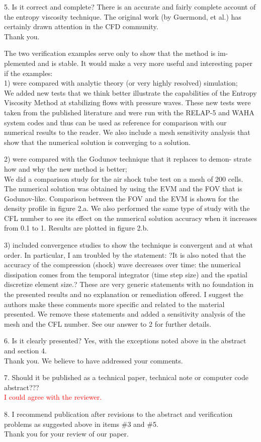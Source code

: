 \documentclass{article}
\newcommand{\tcr}[1]{\textcolor{red}{#1}}
\begin{document}
{\color{blue}
5. Is it correct and complete?
There is an accurate and fairly complete account of the entropy viscosity technique. The original work (by Guermond, et al.) has certainly drawn attention in the CFD community.\\
}
Thank you.

\bigskip

{\color{blue}
The two verification examples serve only to show that the method is im- plemented and is stable. It would make a very more useful and interesting paper if the examples: \\
1) were compared with analytic theory (or very highly resolved) simulation; \\
}
We added new tests that we think better illustrate the capabilities of the Entropy Viscosity Method at stabilizing flows with pressure waves. These new tests were taken from the published literature and were run with the RELAP-5 and WAHA system codes and thus can be used as reference for comparison with our numerical results to the reader. We also include a mesh sensitivity analysis that show that the numerical solution is converging to a solution.
\bigskip

{\color{blue}
2) were compared with the Godunov technique that it replaces to demon- strate how and why the new method is better; \\
}
We did a comparison study for the air shock tube test on a mesh of 200 cells. The numerical solution was obtained by using the EVM and the FOV that is Godunov-like. Comparison between the FOV and the EVM is shown for the density profile in figure 2.a. We also performed the same type of study with the CFL number to see its effect on the numerical solution accuracy when it increases from 0.1 to 1. Results are plotted in figure 2.b.
\bigskip

{\color{blue}
3) included convergence studies to show the technique is convergent and at what order.
In particular, I am troubled by the statement: ?It is also noted that the accuracy of the compression (shock) wave decreases over time: the numerical dissipation comes from the temporal integrator (time step size) and the spatial discretize element size.? These are very generic statements with no foundation in the presented results and no explanation or remediation offered. I suggest the authors make these comments more specific and related to the material presented.
}
We remove these statements and added a sensitivity analysis of the mesh and the CFL number. See our answer to 2 for further details.
\bigskip

{\color{blue}
6. Is it clearly presented?
Yes, with the exceptions noted above in the abstract and section 4. \\
}
Thank you. We believe to have addressed your comments.
\bigskip

{\color{blue}
7. Should it be published as a technical paper, technical note or computer code abstract??? \\}
\tcr{I could agree with the reviewer.}

\bigskip

{\color{blue}
8. I recommend publication after revisions to the abstract and verification problems as suggested above in items \#3 and \#5. \\
}
Thank you for your review of our paper.
\end{document}
